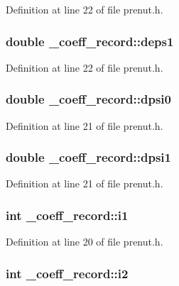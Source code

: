 \-Definition at line 22 of file prenut.\-h.

\subsubsection[{deps1}]{\setlength{\rightskip}{0pt plus 5cm}double {\bf \-\_\-coeff\-\_\-record\-::deps1}}\label{struct__coeff__record_a6df09506dc331fb0af93719e691302b1}


\-Definition at line 22 of file prenut.\-h.

\subsubsection[{dpsi0}]{\setlength{\rightskip}{0pt plus 5cm}double {\bf \-\_\-coeff\-\_\-record\-::dpsi0}}\label{struct__coeff__record_ad7e3d2d5e8de00f3e69f714ab6e2f61d}


\-Definition at line 21 of file prenut.\-h.

\subsubsection[{dpsi1}]{\setlength{\rightskip}{0pt plus 5cm}double {\bf \-\_\-coeff\-\_\-record\-::dpsi1}}\label{struct__coeff__record_aaafae4c1b337d1a5f6a5248609e65645}


\-Definition at line 21 of file prenut.\-h.

\subsubsection[{i1}]{\setlength{\rightskip}{0pt plus 5cm}int {\bf \-\_\-coeff\-\_\-record\-::i1}}\label{struct__coeff__record_af26f8195abb73cea1b054aacf38781bc}


\-Definition at line 20 of file prenut.\-h.

\subsubsection[{i2}]{\setlength{\rightskip}{0pt plus 5cm}int {\bf \-\_\-coeff\-\_\-record\-::i2}}\label{struct__coeff__record_a9d3db03a7779e46f8afb83afc62538e8}


